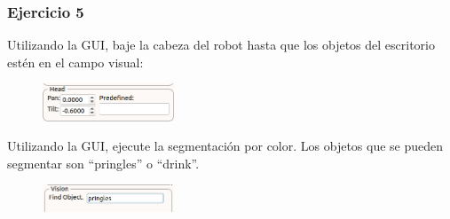 \begin{frame}\frametitle{Ejercicio 5}
  Utilizando la GUI, baje la cabeza del robot hasta que los objetos del escritorio estén en el campo visual:
  \begin{figure}
    \centering
    \includegraphics[width=0.35\textwidth]{Figures/Exercise5Gui1.png}
  \end{figure}
  Utilizando la GUI, ejecute la segmentación por color. Los objetos que se pueden segmentar son ``pringles'' o ``drink''.
  \begin{figure}
    \centering
    \includegraphics[width=0.35\textwidth]{Figures/Exercise5Gui2.png}
  \end{figure}
\end{frame}
